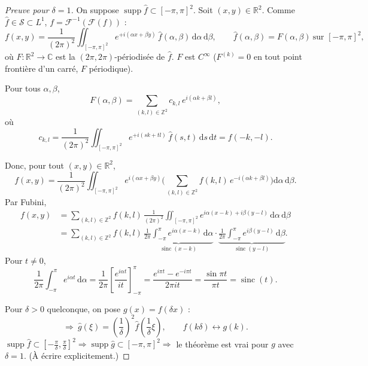\begin{proof}[Preuve pour $\delta=1$]
  On suppose $\operatorname{supp}\hat f\subset[-\pi,\pi]^2$. Soit $(x,y)\in\mathbb{R}^2$. Comme $\hat f\in\mathcal{S}\subset L^1$, $f=\mathcal{F}^{-1}(\mathcal{F}(f))$ :
  \[
    f(x,y)=\frac1{(2\pi)^2}\iint_{[-\pi,\pi]^2}e^{+i(\alpha x+\beta y)}\,\hat f(\alpha,\beta)\,\mathrm{d}\alpha\,\mathrm{d}\beta,
    \qquad
    \hat f(\alpha,\beta)=F(\alpha,\beta)\ \text{sur }[-\pi,\pi]^2,
  \]
  où $F:\mathbb{R}^2\to\mathbb{C}$ est la $(2\pi,2\pi)$-périodisée de $\hat f$. $F$ est $C^\infty$ ($F^{(k)}=0$ en tout point frontière d'un carré, $F$ périodique).
 
  \begin{figure}[!h]\centering
    
  \end{figure}
 
  Pour tous $\alpha,\beta$,
  \[
    F(\alpha,\beta)=\sum_{(k,l)\in\mathbb{Z}^2}c_{k,l}\,e^{i(\alpha k+\beta l)},
  \]
  où
  \[
    c_{k,l}=\frac1{(2\pi)^2}\iint_{[-\pi,\pi]^2}e^{+i(sk+tl)}\,\hat f(s,t)\,\mathrm{d}s\,\mathrm{d}t=f(-k,-l).
  \]

  Donc, pour tout $(x,y)\in\mathbb{R}^2$,
  \[
    f(x,y)=\frac1{(2\pi)^2}\iint_{[-\pi,\pi]^2}e^{i(\alpha x+\beta y)}
    \Bigg(\sum_{(k,l)\in\mathbb{Z}^2}f(k,l)\,e^{-i(\alpha k+\beta l)}\Bigg)\mathrm{d}\alpha\,\mathrm{d}\beta.
  \]
  Par Fubini,
  \begin{align*}
    f(x,y)&=\sum_{(k,l)\in\mathbb{Z}^2}f(k,l)\,\frac1{(2\pi)^2}\iint_{[-\pi,\pi]^2}e^{i\alpha(x-k)+i\beta(y-l)}\,\mathrm{d}\alpha\,\mathrm{d}\beta\\
    &=\sum_{(k,l)\in\mathbb{Z}^2}f(k,l)\,
    \underbrace{\frac1{2\pi}\int_{-\pi}^{\pi}e^{i\alpha(x-k)}\,\mathrm{d}\alpha}_{\operatorname{sinc}(x-k)}\cdot
    \underbrace{\frac1{2\pi}\int_{-\pi}^{\pi}e^{i\beta(y-l)}\,\mathrm{d}\beta}_{\operatorname{sinc}(y-l)}.
  \end{align*}
  Pour $t\neq0$,
  \[
    \frac1{2\pi}\int_{-\pi}^{\pi}e^{i\alpha t}\,\mathrm{d}\alpha
    =\frac1{2\pi}\left[\frac{e^{i\alpha t}}{it}\right]_{-\pi}^{\pi}
    =\frac{e^{i\pi t}-e^{-i\pi t}}{2\pi it}
    =\frac{\sin\pi t}{\pi t}=\operatorname{sinc}(t).
  \]
 
  Pour $\delta>0$ quelconque, on pose $g(x)=f(\delta x)$ :
  \[
    \Rightarrow\ \hat g(\xi)=\left(\frac1\delta\right)^{2}\hat f\!\left(\frac1\delta\xi\right),
    \qquad
    f(k\delta)\longleftrightarrow g(k).
  \]
  $\operatorname{supp}\hat f\subset\left[-\frac\pi\delta,\frac\pi\delta\right]^2\Rightarrow\operatorname{supp}\hat g\subset[-\pi,\pi]^2\Rightarrow$ le théorème est vrai pour $g$ avec $\delta=1$. (À écrire explicitement.)
\end{proof}
 
